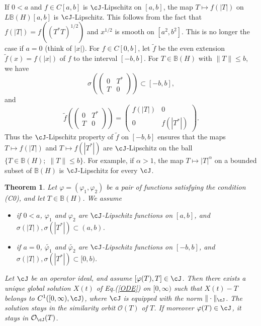 \documentclass[12pt]{article}
\newtheorem{theorem}{Theorem}[section]
\theoremstyle{definition}
\numberwithin{equation}{section}
\newcommand{\B}{\mathbb{B}}
\newcommand{\cO}{\mathcal{O}} \newcommand{\cP}{\mathcal{P}}
\begin{document}
If $0<a$ and $f\in C[a,b]$ is $\cJ$-Lipschitz on $[a,b]$, the map $T\mapsto f(|T|)$ on 
$L\B(H)[a,b]$ is $\cJ$-Lipschitz. 
This follows from the fact that $f(|T|)=f((T^*T)^{1/2})$ and $x^{1/2}$ is smooth on $[a^2,b^2]$. 
This is no longer the case if $a=0$ (think of $|x|$). 
For $f\in C[0,b]$, let $\tilde{f}$ be the even extension $\tilde{f}(x)=f(|x|)$ of $f$ to the interval $[-b,b]$.
For $T\in \B(H)$ with $\|T\|\leq b$, we have 
\[\sigma\left(\begin{pmatrix}
	0 & T^* \\
	T & 0
\end{pmatrix}\right)\subset [-b,b],\]
and 
\[\tilde{f}\left(\begin{pmatrix}
	0 & T^* \\
	T & 0
\end{pmatrix}\right)=
\begin{pmatrix}
f(|T|) & 0 \\
0 & f(|T^*|)
\end{pmatrix}. 
\]
Thus the $\cJ$-Lipschitz property of $\tilde{f}$ on $[-b,b]$ ensures that 
the maps $T\mapsto f(|T|)$ and $T\mapsto f(|T^*|)$ are $\cJ$-Lipschitz on the ball $\{T\in \B(H);\; \|T\|\leq b\}$. 
For example, if $\alpha>1$, the map $T\mapsto |T|^\alpha$ on a bounded subset of $\B(H)$ is $\cJ$-Lipschitz for every $\cJ$. 


\begin{theorem}\label{exi&uni2}
Let $\varphi=(\varphi_1,\varphi_2)$ be a pair of functions satisfying the condition (C0), and let $T\in \B(H)$. 
We assume 
\begin{itemize} 
\item[$(1)$] if $0<a$, $\varphi_1$ and $\varphi_2$ are $\cJ$-Lipschitz functions on $[a,b]$, and 
$\sigma(|T|), \sigma(|T^*|)\subset (a,b)$.  
\item[$(2)$] if $a=0$, $\tilde{\varphi_1}$ and $\tilde{\varphi_2}$ are $\cJ$-Lipschitz functions on $[-b,b]$, 
and $\sigma(|T|), \sigma(|T^*|)\subset [0,b)$. 
\end{itemize}
Let $\cJ$ be an operator ideal, and assume $[\varphi(T),T]\in \cJ$. 
Then there exists a unique global solution $X(t)$ of Eq.(\ref{ODE}) on $[0,\infty)$ such that 
$X(t)-T$ belongs to  $C^1([0,\infty),\cJ)$, where $\cJ$ is equipped with the norm $\|\cdot\|_\cJ$.  
The solution stays in the similarity orbit $\cO(T)$ of $T$. 
If moreover $\varphi(T)\in \cJ$, it stays in $\cO_\cJ(T)$. 
\end{theorem}
\end{document}
